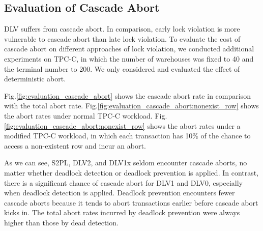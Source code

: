 \documentclass[conference]{IEEEtran}
\begin{document}
\subsection{Evaluation of Cascade Abort}
\begin{highlighted}
DLV suffers from cascade abort. In comparison, early lock violation is more vulnerable to cascade abort than
late lock violation.
To evaluate the cost of cascade abort on different approaches of lock violation, we conducted additional experiments on TPC-C, in which the number of warehouses was fixed to 40  and the terminal number to 200.
We only considered and evaluated the effect of deterministic abort.

Fig.\ref{fig:evaluation_cascade_abort} shows the cascade abort rate in comparison with the total abort rate.
Fig.\ref{fig:evaluation_cascade_abort:nonexist_row}
shows the abort rates under normal TPC-C workload.
Fig.\ref{fig:evaluation_cascade_abort:nonexist_row} 
shows the abort rates under a modified TPC-C workload, in which each transaction has 10\% of the chance to access a non-existent row and incur an abort. 
 
As we can see, S2PL, DLV2, and DLV1x seldom encounter cascade aborts, no matter whether deadlock detection or deadlock prevention is applied. 
In contrast, there is a significant chance of cascade abort for DLV1 and DLV0, especially when deadlock detection is applied. Deadlock prevention encounters fewer cascade aborts because it tends to abort transactions earlier before cascade abort kicks in. The total abort rates incurred by deadlock prevention were always higher than those by dead detection.

\end{highlighted}
\end{document}
